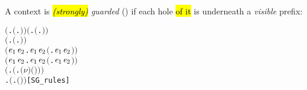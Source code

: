A context is \emph{\hl{(strongly)}  guarded} () if each hole
\hl{of it} is underneath a \emph{visible} prefix:
\begin{alltt}
\HOLTokenTurnstile{} \ensuremath{(}\HOLSymConst{\HOLTokenForall{}}.  \ensuremath{(}\HOLTokenLambda{}. \ensuremath{)}\ensuremath{)} \HOLSymConst{\HOLTokenConj{}} \ensuremath{(}\HOLSymConst{\HOLTokenForall{}} .   \HOLSymConst{\HOLTokenImp{}}  \ensuremath{(}\HOLTokenLambda{}.  \HOLSymConst{\ensuremath{\ldotp}} \ensuremath{)}\ensuremath{)} \HOLSymConst{\HOLTokenConj{}}
   \ensuremath{(}\HOLSymConst{\HOLTokenForall{}} .   \HOLSymConst{\HOLTokenImp{}}  \ensuremath{(}\HOLTokenLambda{}. \HOLSymConst{\ensuremath{\ldotp}} \ensuremath{)}\ensuremath{)} \HOLSymConst{\HOLTokenConj{}}
   \ensuremath{(}\HOLSymConst{\HOLTokenForall{}}\ensuremath{\HOLBoundVar{e}\sb{\mathrm{1}}} \ensuremath{\HOLBoundVar{e}\sb{\mathrm{2}}}.  \ensuremath{\HOLBoundVar{e}\sb{\mathrm{1}}} \HOLSymConst{\HOLTokenConj{}}  \ensuremath{\HOLBoundVar{e}\sb{\mathrm{2}}} \HOLSymConst{\HOLTokenImp{}}  \ensuremath{(}\HOLTokenLambda{}. \ensuremath{\HOLBoundVar{e}\sb{\mathrm{1}}}  \HOLSymConst{\ensuremath{+}} \ensuremath{\HOLBoundVar{e}\sb{\mathrm{2}}} \ensuremath{)}\ensuremath{)} \HOLSymConst{\HOLTokenConj{}}
   \ensuremath{(}\HOLSymConst{\HOLTokenForall{}}\ensuremath{\HOLBoundVar{e}\sb{\mathrm{1}}} \ensuremath{\HOLBoundVar{e}\sb{\mathrm{2}}}.  \ensuremath{\HOLBoundVar{e}\sb{\mathrm{1}}} \HOLSymConst{\HOLTokenConj{}}  \ensuremath{\HOLBoundVar{e}\sb{\mathrm{2}}} \HOLSymConst{\HOLTokenImp{}}  \ensuremath{(}\HOLTokenLambda{}. \ensuremath{\HOLBoundVar{e}\sb{\mathrm{1}}}  \HOLSymConst{\ensuremath{\mid}} \ensuremath{\HOLBoundVar{e}\sb{\mathrm{2}}} \ensuremath{)}\ensuremath{)} \HOLSymConst{\HOLTokenConj{}}
   \ensuremath{(}\HOLSymConst{\HOLTokenForall{}} .   \HOLSymConst{\HOLTokenImp{}}  \ensuremath{(}\HOLTokenLambda{}. \ensuremath{(\nu}\ensuremath{)} \ensuremath{(} \ensuremath{)}\ensuremath{)}\ensuremath{)} \HOLSymConst{\HOLTokenConj{}}
   \HOLSymConst{\HOLTokenForall{}} .   \HOLSymConst{\HOLTokenImp{}}  \ensuremath{(}\HOLTokenLambda{}.  \ensuremath{(} \ensuremath{)} \ensuremath{)}\hfill{[SG_rules]}
\end{alltt}

